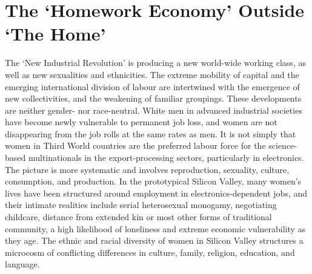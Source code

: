 \documentclass[DIV=12,%
               BCOR=10mm,%
               headinclude=false,%
               footinclude=false,open=any,%
               fontsize=11pt,%
               twoside,%
               paper=210mm:11in]%
               {scrbook}
\begin{document}
\chapter{The ‘Homework Economy’ Outside ‘The Home’}


The ‘New Industrial Revolution’ is producing a new world-wide working class, as well as new sexualities and ethnicities. The extreme mobility of capital and the emerging international division of labour are intertwined with the emergence of new collectivities, and the weakening of familiar groupings. These developments are neither gender- nor race-neutral. White men in advanced industrial societies have become newly vulnerable to permanent job loss, and women are not disappearing from the job rolls at the same rates as men. It is not simply that women in Third World countries are the preferred labour force for the science-based multinationals in the export-processing sectors, particularly in electronics. The picture is more systematic and involves reproduction, sexuality, culture, consumption, and production. In the prototypical Silicon Valley, many women’s lives have been structured around employment in electronics-dependent jobs, and their intimate realities include serial heterosexual monogamy, negotiating childcare, distance from extended kin or most other forms of traditional community, a high likelihood of loneliness and extreme economic vulnerability as they age. The ethnic and racial diversity of women in Silicon Valley structures a microcosm of conflicting differences in culture, family, religion, education, and language.
\end{document}
